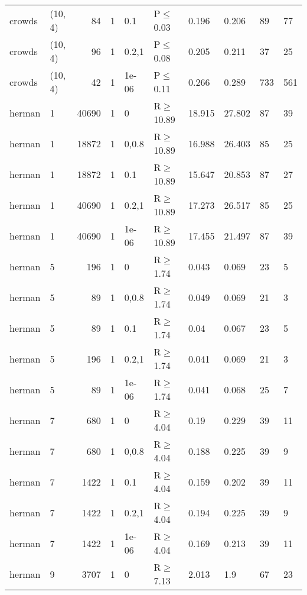 \begin{longtable}{llrrllllll}
 crowds        & (10, 4)  &     	84 & 1 & 0.1   & P$\leq$0.03  & 0.196  & 0.206   & 89      & 77   \\
 crowds        & (10, 4)  &     	96 & 1 & 0.2,1 & P$\leq$0.08  & 0.205  & 0.211   & 37      & 25   \\
 crowds        & (10, 4)  &     	42 & 1 & 1e-06 & P$\leq$0.11  & 0.266  & 0.289   & 733     & 561  \\
 herman        & 1        &  	40690 & 1 & 0     & R$\geq$10.89 & 18.915 & 27.802  & 87      & 39   \\
 herman        & 1        &  	18872 & 1 & 0,0.8 & R$\geq$10.89 & 16.988 & 26.403  & 85      & 25   \\
 herman        & 1        &  	18872 & 1 & 0.1   & R$\geq$10.89 & 15.647 & 20.853  & 87      & 27   \\
 herman        & 1        &  	40690 & 1 & 0.2,1 & R$\geq$10.89 & 17.273 & 26.517  & 85      & 25   \\
 herman        & 1        &  	40690 & 1 & 1e-06 & R$\geq$10.89 & 17.455 & 21.497  & 87      & 39   \\
 herman        & 5        &    	196 & 1 & 0     & R$\geq$1.74  & 0.043  & 0.069   & 23      & 5    \\
 herman        & 5        &     	89 & 1 & 0,0.8 & R$\geq$1.74  & 0.049  & 0.069   & 21      & 3    \\
 herman        & 5        &     	89 & 1 & 0.1   & R$\geq$1.74  & 0.04   & 0.067   & 23      & 5    \\
 herman        & 5        &    	196 & 1 & 0.2,1 & R$\geq$1.74  & 0.041  & 0.069   & 21      & 3    \\
 herman        & 5        &     	89 & 1 & 1e-06 & R$\geq$1.74  & 0.041  & 0.068   & 25      & 7    \\
 herman        & 7        &    	680 & 1 & 0     & R$\geq$4.04  & 0.19   & 0.229   & 39      & 11   \\
 herman        & 7        &    	680 & 1 & 0,0.8 & R$\geq$4.04  & 0.188  & 0.225   & 39      & 9    \\
 herman        & 7        &   	1422 & 1 & 0.1   & R$\geq$4.04  & 0.159  & 0.202   & 39      & 11   \\
 herman        & 7        &   	1422 & 1 & 0.2,1 & R$\geq$4.04  & 0.194  & 0.225   & 39      & 9    \\
 herman        & 7        &   	1422 & 1 & 1e-06 & R$\geq$4.04  & 0.169  & 0.213   & 39      & 11   \\
 herman        & 9        &   	3707 & 1 & 0     & R$\geq$7.13  & 2.013  & 1.9     & 67      & 23   \\

\end{longtable}
